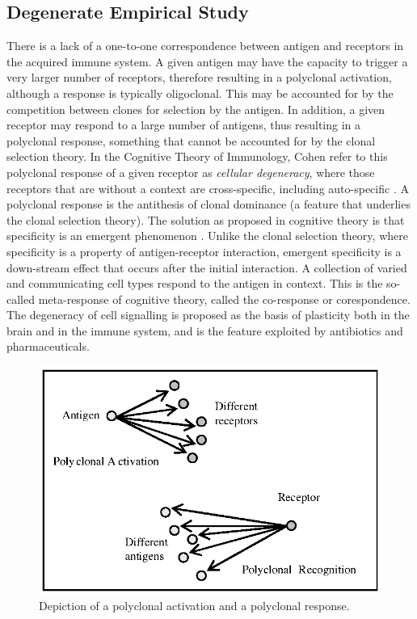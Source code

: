 \subsection{Degenerate Empirical Study}
\label{sec:cells:ccsa:dcsa}
There is a lack of a one-to-one correspondence between antigen and receptors in the acquired immune system. A given antigen may have the capacity to trigger a very larger number of receptors, therefore resulting in a polyclonal activation, although a response is typically oligoclonal. This may be accounted for by the competition between clones for selection by the antigen. In addition, a given receptor may respond to a large number of antigens, thus resulting in a polyclonal response, something that cannot be accounted for by the clonal selection theory. In the Cognitive Theory of Immunology, Cohen refer to this polyclonal response of a given receptor as \emph{cellular degeneracy}, where those receptors that are without a context are cross-specific, including auto-specific \cite{Cohen2004}. A polyclonal response is the antithesis of clonal dominance (a feature that underlies the clonal selection theory). The solution as proposed in cognitive theory is that specificity is an emergent phenomenon \cite{Cohen2001, Hershberg2003}. Unlike the clonal selection theory, where specificity is a property of antigen-receptor interaction, emergent specificity is a down-stream effect that occurs after the initial interaction. A collection of varied and communicating cell types respond to the antigen in context. This is the so-called meta-response of cognitive theory, called the co-response or corespondence. The degeneracy of cell signalling is proposed as the basis of plasticity both in the brain and in the immune system, and is the feature exploited by antibiotics and pharmaceuticals.

\begin{figure}[htp]
	\centering
	\includegraphics[scale=0.85]{ClonalSelection/cognitive-polyclonal}
	\caption{Depiction of a polyclonal activation and a polyclonal response.}
	\label{pic:cognitive:polyclonal}
\end{figure}

